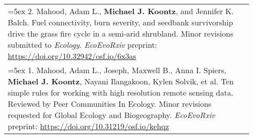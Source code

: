\begin{longtable}{@{} >{\raggedright}p{6.10in} >{\raggedleft}X @{}}

\hangindent=5ex 2. Mahood, Adam L., \textbf{Michael J. Koontz}, and Jennifer K. Balch. Fuel connectivity, burn severity, and seedbank survivorship drive the grass fire cycle in a semi-arid shrubland. Minor revisions submitted to \emph{Ecology}. 
\newline \emph{EcoEvoRxiv} preprint: \href{https://doi.org/10.32942/osf.io/6x3as}{https://doi.org/10.32942/osf.io/6x3as} & \tabularnewline

\hangindent=5ex 1. Mahood, Adam L., Joseph, Maxwell B., Anna I. Spiers, \textbf{Michael J. Koontz}, Nayani Ilangakoon, Kylen Solvik, et al. Ten simple rules for working with high resolution remote sensing data. Reviewed by Peer Communities In Ecology. Minor revisions requested for Global Ecology and Biogeography.
\newline \emph{EcoEvoRxiv} preprint: \href{https://doi.org/10.31219/osf.io/kehqz}{https://doi.org/10.31219/osf.io/kehqz} & \tabularnewline


\end{longtable}
